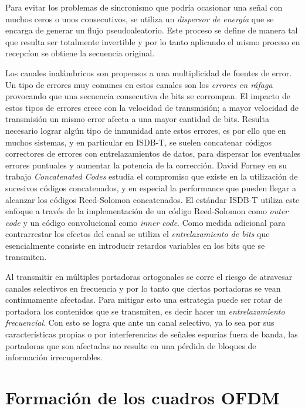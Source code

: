 Para evitar los problemas de sincronismo que podr\'ia ocasionar una señal con muchos ceros o unos consecutivos, se utiliza un \textit{dispersor de energ\'ia} que se encarga de generar un flujo pseudoaleatorio. Este proceso se define de manera tal que resulta ser totalmente invertible y por lo tanto aplicando el mismo proceso en recepc\'ion se obtiene la secuencia original.



Los canales inal\'ambricos son propensos a una multiplicidad de fuentes de error. Un tipo de errores muy comunes en estos canales son los \textit{errores en r\'afaga} provocando que una secuencia consecutiva de bits se corrompan. El impacto de estos tipos de errores crece con la velocidad de transmisi\'on; a mayor velocidad de transmisi\'on un mismo error afecta a una mayor cantidad de bits.
Resulta necesario lograr alg\'un tipo de inmunidad ante estos errores, es por ello que en muchos sistemas, y en particular en ISDB-T, se suelen concatenar c\'odigos correctores de errores con entrelazamientos de datos, para dispersar los eventuales errores puntuales y aumentar la potencia de la corrección. David Forney en su trabajo \textit{Concatenated Codes} \cite{forney1965concatenated} estudia el compromiso que existe en la utilizaci\'on de sucesivos c\'odigos concatenados, y en especial la performance que pueden llegar a alcanzar los c\'odigos Reed-Solomon concatenados.
El est\'andar ISDB-T utiliza este enfoque a trav\'es de la implementaci\'on de un c\'odigo Reed-Solomon como \textit{outer code} y un c\'odigo convolucional como \textit{inner code}.
Como medida adicional para contrarrestar los efectos del canal se utiliza el \textit{entrelazamiento de bits} que esencialmente consiste en introducir retardos variables en los bits que se transmiten.

Al transmitir en m\'ultiples portadoras ortogonales se corre el riesgo de atravesar canales selectivos en frecuencia y por lo tanto que ciertas portadoras se vean continuamente afectadas. Para mitigar esto una estrategia puede ser rotar de portadora los contenidos que se transmiten, es decir hacer un \textit{entrelazamiento frecuencial}. Con esto se logra que ante un canal selectivo, ya lo sea por sus caracter\'isticas propias o por interferencias de señales espurias fuera de banda, las portadoras que son afectadas no resulte en una p\'erdida de bloques de informaci\'on irrecuperables.


\section{Formación de los cuadros OFDM}

